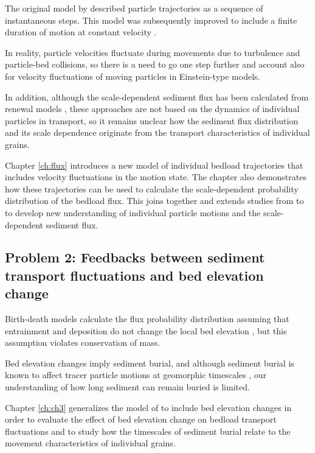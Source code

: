 The original model by \citet{Einstein1937} described particle trajectories as a sequence of instantaneous steps. This model was subsequently improved to include a finite duration of motion at constant velocity \citep{Lisle1998,Lajeunesse2017}.

In reality, particle velocities fluctuate during movements due to turbulence and particle-bed collisions, so there is a need to go one step further and account also for velocity fluctuations of moving particles in Einstein-type models.

In addition, although the scale-dependent sediment flux has been calculated from renewal models \citep{Turowski2010,Ancey2020a}, these approaches are not based on the dynamics of individual particles in transport, so it remains unclear how the sediment flux distribution and its scale dependence originate from the transport characteristics of individual grains.

Chapter \ref{ch:flux} introduces a new model of individual bedload trajectories that includes velocity fluctuations in the motion state. The chapter also demonstrates how these trajectories can be used to calculate the scale-dependent probability distribution of the bedload flux.
This joins together and extends studies from \citet{Einstein1937} to \citet{Ancey2020a} to develop new understanding of individual particle motions and the scale-dependent sediment flux.

\subsection{Problem 2: Feedbacks between sediment transport fluctuations and bed elevation change}

Birth-death models calculate the flux probability distribution assuming that entrainment and deposition do not change the local bed elevation \citep{Heyman2013,Ancey2014}, but this assumption violates conservation of mass.

Bed elevation changes imply sediment burial, and although sediment burial is known to affect tracer particle motions at geomorphic timescales \citep{Ferguson2002,Hassan2017}, our understanding of how long sediment can remain buried is limited.

Chapter \ref{ch:ch3} generalizes the model of \citet{Ancey2008} to include bed elevation changes in order to evaluate the effect of bed elevation change on bedload transport fluctuations and to study how the timescales of sediment burial relate to the movement characteristics of individual grains.

